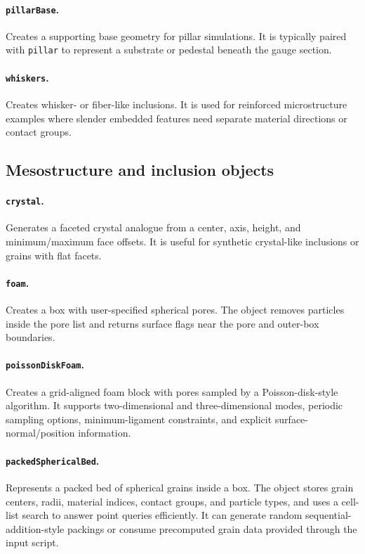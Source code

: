 \paragraph{\texttt{pillarBase}.}Creates a supporting base geometry for pillar simulations.  It is typically paired with \texttt{pillar} to represent a substrate or pedestal beneath the gauge section.

\paragraph{\texttt{whiskers}.}Creates whisker- or fiber-like inclusions.  It is used for reinforced microstructure examples where slender embedded features need separate material directions or contact groups.

\subsection{Mesostructure and inclusion objects}

\paragraph{\texttt{crystal}.}Generates a faceted crystal analogue from a center, axis, height, and minimum/maximum face offsets.  It is useful for synthetic crystal-like inclusions or grains with flat facets.

\paragraph{\texttt{foam}.}Creates a box with user-specified spherical pores.  The object removes particles inside the pore list and returns surface flags near the pore and outer-box boundaries.

\paragraph{\texttt{poissonDiskFoam}.}Creates a grid-aligned foam block with pores sampled by a Poisson-disk-style algorithm.  It supports two-dimensional and three-dimensional modes, periodic sampling options, minimum-ligament constraints, and explicit surface-normal/position information.

\paragraph{\texttt{packedSphericalBed}.}Represents a packed bed of spherical grains inside a box.  The object stores grain centers, radii, material indices, contact groups, and particle types, and uses a cell-list search to answer point queries efficiently.  It can generate random sequential-addition-style packings or consume precomputed grain data provided through the input script.

